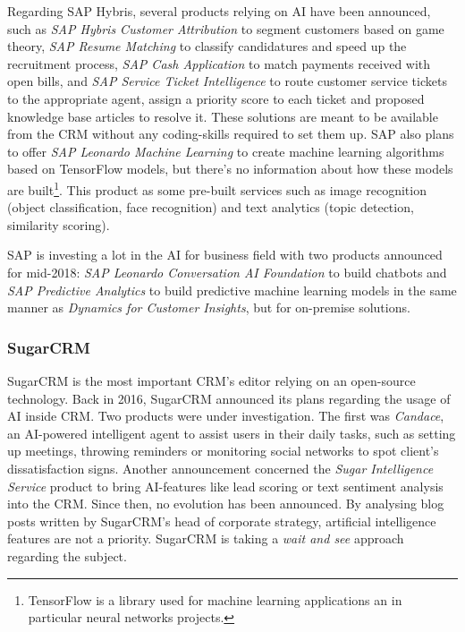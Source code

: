 Regarding SAP Hybris, several products relying on AI have been announced, such as \textit{SAP Hybris Customer Attribution} to segment customers based on game theory, \textit{SAP Resume Matching} to classify candidatures and speed up the recruitment process, \textit{SAP Cash Application} to match payments received with open bills, and \textit{SAP Service Ticket Intelligence} to route customer service tickets to the appropriate agent, assign a priority score to each ticket and proposed knowledge base articles to resolve it. These solutions are meant to be available from the CRM without any coding-skills required to set them up. SAP also plans to offer \textit{SAP Leonardo Machine Learning} to create machine learning algorithms based on TensorFlow models, but there's no information about how these models are built\footnote{TensorFlow is a library used for machine learning applications an in particular neural networks projects.}. This product as some pre-built services such as image recognition (object classification, face recognition) and text analytics (topic detection, similarity scoring). 

SAP is investing a lot in the AI for business field with two products announced for mid-2018: \textit{SAP Leonardo Conversation AI Foundation} to build chatbots and \textit{SAP Predictive Analytics} to build predictive machine learning models in the same manner as \textit{Dynamics for Customer Insights}, but for on-premise solutions.


\subsubsection*{SugarCRM}
SugarCRM is the most important CRM's editor relying on an open-source technology. Back in 2016, SugarCRM announced its plans regarding the usage of AI inside CRM. Two products were under investigation. The first was \textit{Candace}, an AI-powered intelligent agent to assist users in their daily tasks, such as setting up meetings, throwing reminders or monitoring social networks to spot client's dissatisfaction signs. Another announcement concerned the \textit{Sugar Intelligence Service} product to bring AI-features like lead scoring or text sentiment analysis into the CRM. Since then, no evolution has been announced. By analysing blog posts written by SugarCRM's head of corporate strategy, artificial intelligence features are not a priority. SugarCRM is taking a \textit{wait and see} approach \cite{sugarcrm1,sugarcrm2} regarding the subject.

